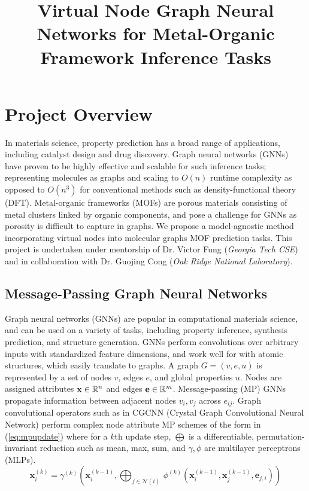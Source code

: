 \documentclass{lxaiproposal}
\title{Virtual Node Graph Neural Networks for Metal-Organic Framework Inference Tasks\\}
\author{\coord{Sidharth Baskaran}{}{1}}
\begin{document}
\noindent
\maketitle

\section*{Project Overview}

In materials science, property prediction has a broad range of applications, including
 catalyst design and drug discovery. Graph neural networks (GNNs) have proven to be highly effective and scalable for such inference tasks; representing molecules as graphs and scaling to $O(n)$ runtime complexity as opposed to $O(n^3)$ for conventional methods such as density-functional theory (DFT). Metal-organic frameworks (MOFs) are porous materials consisting of metal clusters linked by organic components, and pose a challenge for GNNs as porosity is difficult to capture in graphs. We propose a model-agnostic method incorporating virtual nodes into molecular graphs MOF prediction tasks. This project is undertaken under mentorship of Dr. Victor Fung (\textit{Georgia Tech CSE}) and in collaboration with Dr. Guojing Cong (\textit{Oak Ridge National Laboratory}).

\subsection*{Message-Passing Graph Neural Networks}

Graph neural networks (GNNs) are popular in computational materials science, and can be used on a variety of tasks, including property inference, synthesis prediction, and structure generation\cite{Reiser2022}. GNNs perform convolutions over arbitrary inputs with standardized feature dimensions, and work well for with atomic structures, which easily translate to graphs. A graph $G=(v,e,u)$ is represented by a set of nodes $v$, edges $e$, and global properties $u$. Nodes are assigned attributes ${\bf x}\in \mathbb{R}^{n}$ and edges ${\bf e}\in \mathbb{R}^m$. Message-passing (MP) GNNs propagate information between adjacent nodes $v_i,v_j$ across $e_{ij}$. Graph convolutional operators such as in CGCNN (Crystal Graph Convolutional Neural Network)\cite{Xie_2018} perform complex node attribute MP schemes of the form in (\ref{eq:mpupdate}) where for a $k$th update step, $\bigoplus$ is a differentiable, permutation-invariant reduction such as mean, max, sum, and $\gamma,\phi$ are multilayer perceptrons (MLPs)\cite{sanchez-lengeling2021a}.
\begin{equation}
    \textstyle
    \mathbf{x}_i^{(k)} = \gamma^{(k)} \left( \mathbf{x}_i^{(k-1)}, \bigoplus_{j \in \mathcal{N}(i)} \, \phi^{(k)}\left(\mathbf{x}_i^{(k-1)}, \mathbf{x}_j^{(k-1)},\mathbf{e}_{j,i}\right) \right)
    \label{eq:mpupdate}
\end{equation}
\end{document}
